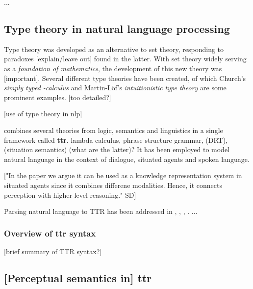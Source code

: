 ...



\subsection{Type theory in natural language processing}
\label{ssec:ttnlp}

Type theory was developed as an alternative to set theory, responding to paradoxes [explain/leave out] found in the latter.
With set theory widely serving as a \textit{foundation of mathematics}, the development of this new theory was [important].
Several different type theories have been created, of which Church's \textit{simply typed \textlambda-calculus} \cite{church40} and Martin-Löf's \textit{intuitionistic type theory} \citep{martinlof84} are some prominent examples.
\citep{CoquandTypeTheory2015} [too detailed?]

[use of type theory in nlp]

\cite{CooperRecordsRecordTypes2005} combines several theories from logic, semantics and linguistics in a single framework called \textbf{\acrfull{ttr}}.
 lambda calculus, phrase structure grammar, (DRT), (situation semantics) (what are the latter)?
It has been employed to model natural language in the context of dialogue, situated agents and spoken language.
\cite{Barwisesituationlogic1989}

["In the paper we argue it can be used as a knowledge representation system in situated agents since it combines differene modalities. Hence, it connects perception with higher-level reasoning." SD]

Parsing natural language to TTR has been addressed in \cite{CooperRecordsRecordTypes2005}, \cite{RobinCooperAustiniantruthattitudes2005}, \cite{CooperTypetheorysemantics2012}, \cite{CooperTypetheorylanguage2016}.
...




\subsubsection{Overview of \gls{ttr} syntax}

[brief summary of TTR syntax?]



\subsection{[Perceptual semantics in] \acrfull{ttr}}

\cite{LarssonDialoguesHaveContent2011}

